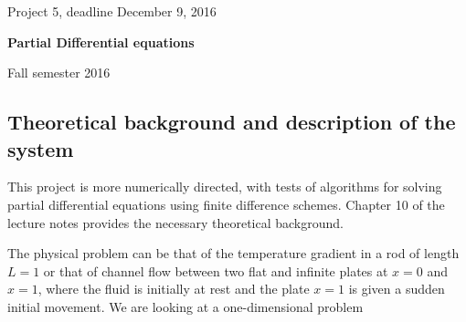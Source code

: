 \documentclass[%
oneside,                 %
final,                   %
10pt]{article}
\begin{document}

\newcommand{\exercisesection}[1]{\subsection*{#1}}






\thispagestyle{empty}

\begin{center}
{\LARGE\bf
\begin{spacing}{1.25}
Project 5, deadline  December 9, 2016
\end{spacing}
}
\end{center}


\begin{center}
{\bf Partial Differential equations${}^{}$} \\ [0mm]
\end{center}

\begin{center}
\end{center}
    

\begin{center}
Fall semester 2016
\end{center}

\vspace{1cm}


\subsection*{Theoretical background and description of the system}

This project is more numerically directed, with tests
of algorithms for solving partial differential equations using finite difference schemes. 
Chapter 10 of the lecture notes provides the necessary theoretical background.

The physical problem can be that of the temperature gradient in a rod of length $L=1$ or that of channel flow
between two flat and infinite plates at $x=0$ and $x=1$, where the fluid is initially at rest
and the plate $x=1$ is given a sudden initial movement.  We are looking at a one-dimensional
problem
\end{document}
